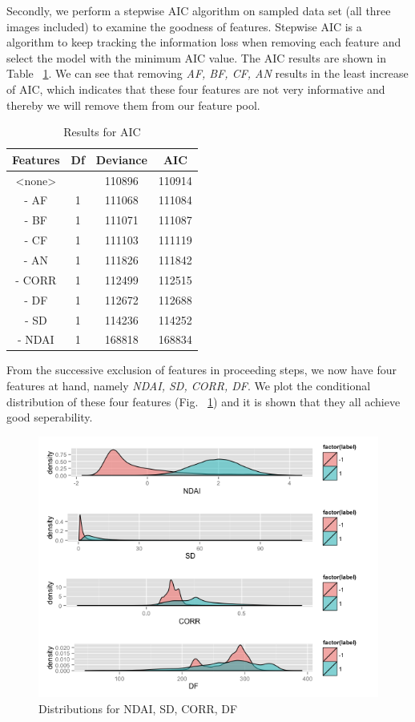 \documentclass[english]{article}\usepackage{graphicx, color}
\numberwithin{equation}{section}
\numberwithin{figure}{section}
\begin{document}
Secondly, we perform a stepwise AIC algorithm on sampled data set (all three 
images included) to examine the goodness of features. Stepwise AIC is a 
algorithm to keep tracking the information loss when removing each feature 
and select the model with the minimum AIC value. The AIC results are shown 
in Table ~\ref{tab:PermTest}. We can see that removing \textit{AF, BF, CF, AN} 
results in the least increase of AIC, which indicates that these four features 
are not very informative and thereby we will remove them from our feature pool.
\begin{table}[!h]
\centering
\begin{tabular}{*{4}{c}}
Features & Df & Deviance & AIC\\
       \hline
<none>   &    & 110896   & 110914\\
- AF     & 1  & 111068   & 111084\\
- BF     & 1  & 111071   & 111087\\
- CF     & 1  & 111103   & 111119\\
- AN     & 1  & 111826   & 111842\\
- CORR   & 1  & 112499   & 112515\\
- DF     & 1  & 112672   & 112688\\
- SD     & 1  & 114236   & 114252\\
- NDAI   & 1  & 168818   & 168834\\
\end{tabular}
\caption{Results for AIC}
\label{tab:PermTest}
\end{table}

From the successive exclusion of features in proceeding steps, we now have 
four features at hand, namely \textit{NDAI, SD, CORR, DF}. We plot the 
conditional distribution of these four features (Fig. ~\ref{fig:CD}) and it is 
shown that they all achieve good seperability.

\begin{figure}[!h]
  \begin{center}
    \includegraphics[width=\columnwidth]{figures/ConditionalDistribution.png}
  \end{center}
  \caption{Distributions for NDAI, SD, CORR, DF}
  \label{fig:CD}
\end{figure}
\end{document}
